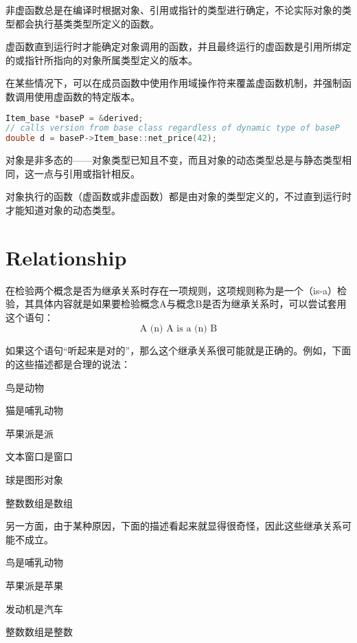 \begin{compactitem}
\item 非虚函数总是在编译时根据对象、引用或指针的类型进行确定，不论实际对象的类型都会执行基类类型所定义的函数。
\item 虚函数直到运行时才能确定对象调用的函数，并且最终运行的虚函数是引用所绑定的或指针所指向的对象所属类型定义的版本。
\end{compactitem}

在某些情况下，可以在成员函数中使用作用域操作符来覆盖虚函数机制，并强制函数调用使用虚函数的特定版本。

\begin{lstlisting}[language=C++]
Item_base *baseP = &derived;
// calls version from base class regardless of dynamic type of baseP
double d = baseP->Item_base::net_price(42);
\end{lstlisting}

对象是非多态的——对象类型已知且不变，而且对象的动态类型总是与静态类型相同，这一点与引用或指针相反。


对象执行的函数（虚函数或非虚函数）都是由对象的类型定义的，不过直到运行时才能知道对象的动态类型。





\section{Relationship}




在检验两个概念是否为继承关系时存在一项规则，这项规则称为是一个（is-a）检验，其具体内容就是如果要检验概念A与概念B是否为继承关系时，可以尝试套用这个语句：
\[\mbox{A (n) A is a (n) B}\]

如果这个语句“听起来是对的”，那么这个继承关系很可能就是正确的。例如，下面的这些描述都是合理的说法：

\begin{compactenum}
\item 鸟是动物
\item 猫是哺乳动物
\item 苹果派是派
\item 文本窗口是窗口
\item 球是图形对象
\item 整数数组是数组
\end{compactenum}

另一方面，由于某种原因，下面的描述看起来就显得很奇怪，因此这些继承关系可能不成立。

\begin{compactenum}
\item 鸟是哺乳动物
\item 苹果派是苹果
\item 发动机是汽车
\item 整数数组是整数
\end{compactenum}

